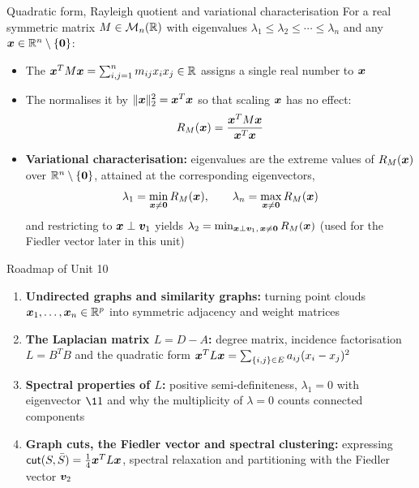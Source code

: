 \documentclass[aspectratio=169]{beamer}\usepackage[]{graphicx}\usepackage[]{xcolor}
\begin{document}
\begin{frame}{Quadratic form, Rayleigh quotient and variational characterisation}
For a real symmetric matrix $M \in \mathcal{M}_n(\mathbb{R})$ with eigenvalues $\lambda_1 \le \lambda_2 \le \cdots \le \lambda_n$ and any $\bx \in \IR^n \setminus \{\b0\}$:
\vfill
\begin{itemize}
\item The  $\bm{x}^T M \bm{x} = \sum_{i,j=1}^n m_{ij} x_i x_j \in \mathbb{R}$ assigns a single real number to $\bm{x}$
\vfill
\item The  normalises it by $\|\bm{x}\|_2^2 = \bm{x}^T \bm{x}$ so that scaling $\bm{x}$ has no effect:
\[
R_M(\bm{x}) = \frac{\bm{x}^T M \bm{x}}{\bm{x}^T \bm{x}}
\]
\item \textbf{Variational characterisation:} eigenvalues are the extreme values of $R_M(\bm{x})$ over $\IR^n \setminus \{\b0\}$, attained at the corresponding eigenvectors,
\[
\lambda_1 = \min_{\bx \neq \b0} R_M(\bx), \qquad \lambda_n = \max_{\bx \neq \b0} R_M(\bx)
\]
and restricting to $\bm{x} \perp \bm{v}_1$ yields $\lambda_2 = \min_{\bx \perp \bv_1,\, \bx \neq \b0} R_M(\bx)$ (used for the Fiedler vector later in this unit)
\end{itemize}
\end{frame}


\begin{frame}{Roadmap of Unit 10}
\begin{enumerate}
\item \textbf{Undirected graphs and similarity graphs:} turning point clouds $\bm{x}_1, \ldots, \bm{x}_n \in \mathbb{R}^p$ into symmetric adjacency and weight matrices
\vfill
\item \textbf{The Laplacian matrix $L = D - A$:} degree matrix, incidence factorisation $L = B^T B$ and the quadratic form $\bm{x}^T L \bm{x} = \sum_{\{i,j\}\in E} a_{ij}(x_i - x_j)^2$
\vfill
\item \textbf{Spectral properties of $L$:} positive semi-definiteness, $\lambda_1 = 0$ with eigenvector $\11$ and why the multiplicity of $\lambda = 0$ counts connected components
\vfill
\item \textbf{Graph cuts, the Fiedler vector and spectral clustering:} expressing $\mathsf{cut}(S, \bar{S}) = \frac{1}{4}\bm{x}^T L \bm{x}$, spectral relaxation and partitioning with the Fiedler vector $\bm{v}_2$
\end{enumerate}
\end{frame}


\end{document}
